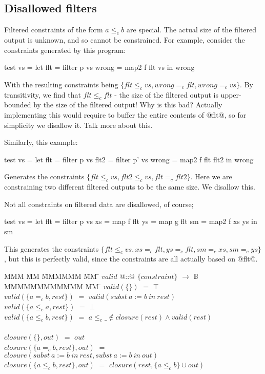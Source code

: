 \subsection{Disallowed filters}

Filtered constraints of the form $a \le_c b$ are special.
The actual size of the filtered output is unknown, and so cannot be constrained.
For example, consider the constraints generated by this program:
\begin{code}
test vs    =
 let flt   = filter p vs
     wrong = map2   f flt vs
 in  wrong
\end{code}
With the resulting constraints being $\{flt \le_c vs, wrong =_c flt, wrong =_c vs\}$.
By transitivity, we find that $flt \le_c flt$ - the size of the filtered output is upper-bounded by the size of the filtered output! 
Why is this bad?
Actually implementing this would require to buffer the entire contents of @flt@, so for simplicity we disallow it. Talk more about this.   

Similarly, this example:
\begin{code}
test vs    =
 let flt   = filter p  vs
     flt2  = filter p' vs
     wrong = map2   f  flt flt2
 in  wrong
\end{code}
Generates the constraints $\{flt \le_c vs, flt2 \le_c vs, flt =_c flt2\}$.
Here we are constraining two different filtered outputs to be the same size.
We disallow this.

Not all constraints on filtered data are disallowed, of course;
\begin{code}
test vs    =
 let flt   = filter p  vs
     xs    = map    f  flt
     ys    = map    g  flt
     sm    = map2   f  xs ys
 in  sm
\end{code}
This generates the constraints $\{flt \le_c vs, xs =_c flt, ys =_c flt, sm =_c xs, sm =_c ys\}$,
but this is perfectly valid, since the constraints are all actually based on @flt@.

\begin{tabbing}
MMM       \= MM \= MMMMMM \= MM \= \kill
$valid$   \> @::@  \> $\{constraint\}$  \> $\to$ \> $\mathbb{B}$ \\
MMMMMMMMMMMM                 \= MM  \= \kill
$valid(\{             \})$   \> $=$ \> $\top$  \\
$valid(\{a =_c b, rest\})$   \> $=$ \> $valid(subst~a:=b~in~rest)$  \\
$valid(\{a \le_c a, rest\})$ \> $=$ \> $\bot$                        \\
$valid(\{a \le_c b, rest\})$ \> $=$ \> $a \le_c \_ \not\in closure(rest) \wedge valid(rest)$                        \\
\\
$closure(\{\}, out)$                \> $=$ \> $out$ \\
$closure(\{a =_c b, rest\}, out)$   \> $=$ \> $closure(subst~a:=b~in~rest, subst~a:=b~in~out)$  \\
$closure(\{a \le_c b, rest\}, out)$ \> $=$ \> $closure(rest, \{a \le_c b\} \cup out)$ \\
\end{tabbing}



